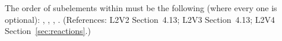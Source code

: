 The order of subelements within \Reaction must be the following
(where every one is optional): ,
, ,
.  (References: L2V2 Section~4.13; L2V3
Section~4.13; L2V4 Section~\ref{sec:reactions}.)
